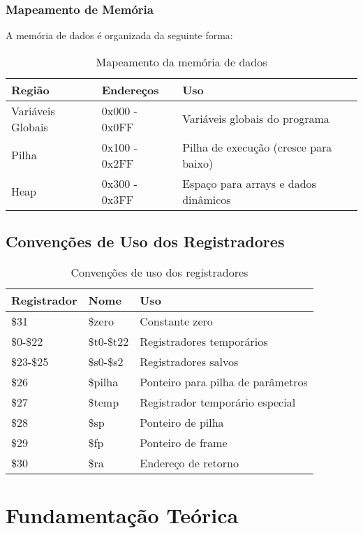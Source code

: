 \documentclass[
	12pt,				%
	oneside,
	a4paper,			%
	english,			%
	french,				%
	spanish,			%
	brazil,				%
	]{abntex2}
\begin{document}
\subsection{Mapeamento de Memória}
A memória de dados é organizada da seguinte forma:

\begin{table}[H]
\centering
\caption{Mapeamento da memória de dados}
\begin{tabular}{|l|l|l|}
\hline
\textbf{Região} & \textbf{Endereços} & \textbf{Uso} \\
\hline
Variáveis Globais & 0x000 - 0x0FF & Variáveis globais do programa \\
\hline
Pilha & 0x100 - 0x2FF & Pilha de execução (cresce para baixo) \\
\hline
Heap & 0x300 - 0x3FF & Espaço para arrays e dados dinâmicos \\
\hline
\end{tabular}
\end{table}

\section{Convenções de Uso dos Registradores}

\begin{table}[H]
\centering
\caption{Convenções de uso dos registradores}
\begin{tabular}{|l|l|l|}
\hline
\textbf{Registrador} & \textbf{Nome} & \textbf{Uso} \\
\hline
\$31 & \$zero & Constante zero \\
\hline
\$0-\$22 & \$t0-\$t22 & Registradores temporários \\
\hline
\$23-\$25 & \$s0-\$s2 & Registradores salvos \\
\hline
\$26 & \$pilha & Ponteiro para pilha de parâmetros \\
\hline
\$27 & \$temp & Registrador temporário especial \\
\hline
\$28 & \$sp & Ponteiro de pilha \\
\hline
\$29 & \$fp & Ponteiro de frame \\
\hline
\$30 & \$ra & Endereço de retorno \\
\hline
\end{tabular}
\end{table}

\chapter{Fundamentação Teórica}
\end{document}
